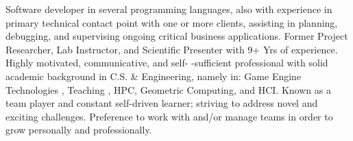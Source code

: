 

\begin{cvsummary}

Software developer in several programming languages, also with experience in primary technical contact point with one or more clients, assisting in planning, debugging, and supervising ongoing critical business applications.
Former Project Researcher, Lab Instructor, and Scientific Presenter with 9+ Yrs of experience.
Highly motivated, communicative, and self-
-sufficient %
professional with solid academic background in C.S. \& Engineering, namely in: 
Game Engine Technologies
, Teaching%
, HPC, Geometric Computing, and HCI.
Known as a team player %
and constant self-driven learner; 
striving to address novel and exciting challenges. %
Preference to work with and/or manage teams in order to grow personally and professionally.
\end{cvsummary}
